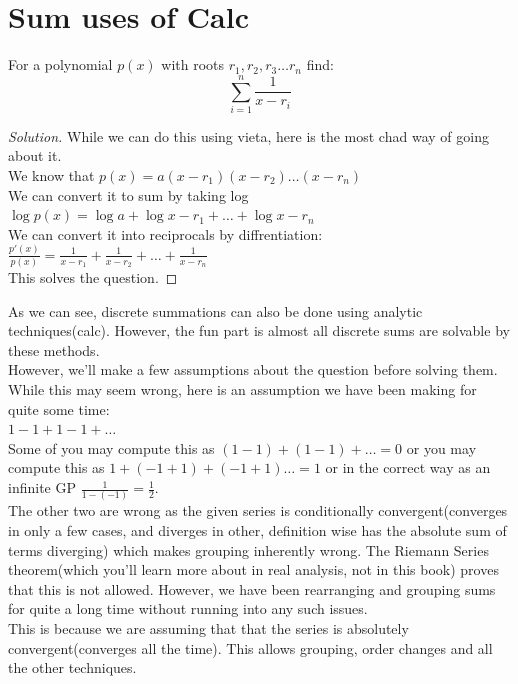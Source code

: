 \section{Sum uses of Calc}
\begin{example}
    For a polynomial $p(x)$ with roots $r_1,r_2,r_3 \dots r_n$ find:\\
    \[\sum^n_{i=1}\frac{1}{x-r_i}\]
\end{example}
\begin{proof}
    [Solution]
    While we can do this using vieta, here is the most chad way of going about it.\\
    We know that $p(x)=a(x-r_1)(x-r_2)\dots(x-r_n)$\\
    We can convert it to sum by taking log $\log{p(x)}=\log{a}+\log{x-r_1}+\dots+\log{x-r_n}$\\
    We can convert it into reciprocals by diffrentiation:\\
    $\frac{p'(x)}{p(x)}=\frac{1}{x-r_1}+\frac{1}{x-r_2}+\dots +\frac{1}{x-r_n}$\\
    This solves the question.
\end{proof}
As we can see, discrete summations can also be done using analytic techniques(calc). However, the fun part is almost all discrete sums are solvable by these methods.\\
However, we'll make a few assumptions about the question before solving them. While this may seem wrong, here is an assumption we have been making for quite some time:\\
$1-1+1-1+\dots$\\
Some of you may compute this as $(1-1)+(1-1)+\dots =0$ or you may compute this as $1+(-1+1)+(-1+1)\dots =1$ or in the correct way as an infinite GP $\frac{1}{1-(-1)}=\frac{1}{2}$.\\
The other two are wrong as the given series is conditionally convergent(converges in only a few cases, and diverges in other, definition wise has the absolute sum of terms diverging) which makes grouping inherently wrong. The Riemann Series theorem(which you'll learn more about in real analysis, not in this book) proves that this is not allowed. However, we have been rearranging and grouping sums for quite a long time without running into any such issues.\\
This is because we are assuming that that the series is absolutely convergent(converges all the time). This allows grouping, order changes and all the other techniques.\\

